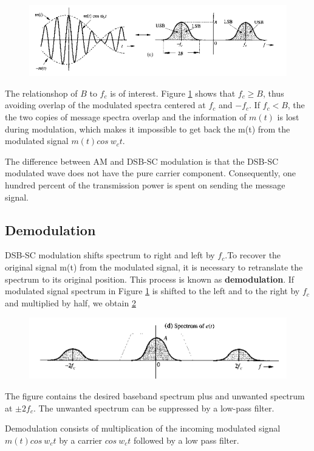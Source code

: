 \begin{figure}[h!]
  \includegraphics[width = 1.1\textwidth]{figures/DSBSC1.png}
  \caption{}
  \label{fig:DSBSC2}
\end{figure}

The relationshop of $B$ to $f_c$ is of interest. Figure \ref{fig:DSBSC2} shows that $f_c \geq B$, thus avoiding overlap of the modulated spectra centered at $f_c$ and $-f_c$. If $f_c < B$, the the two copies of message spectra overlap and the information of $m(t)$ is lost during modulation, which makes it impossible to get back the m(t) from the modulated signal $m(t)cos~w_ct$.
\par The difference between AM and DSB-SC modulation is that the DSB-SC modulated wave does not
have the pure carrier component. Consequently, one hundred percent of the transmission power is
spent on sending the message signal.

\subsection{Demodulation}
DSB-SC modulation shifts spectrum to right and left by $f_c$.To recover the original signal m(t) from the modulated signal, it is necessary to retranslate the spectrum to its original position. This process is known as \textbf{demodulation}.
If modulated signal spectrum in Figure \ref{fig:DSBSC2} is
shifted to the left and to the right by $f_c$ and multiplied by
half, we obtain \ref{fig:DSBSC3}

\begin{figure}[h!]
  \includegraphics[width = 1.1\textwidth]{figures/DSBSC3.png}
  \caption{}
  \label{fig:DSBSC3}
\end{figure}

The figure contains the desired baseband spectrum plus and unwanted spectrum at $\pm 2f_c$. The unwanted spectrum can be suppressed by a low-pass filter.
\par Demodulation consists of multiplication of the incoming
modulated signal $m(t)cos~w_ct$ by a carrier $cos~w_ct$ followed by a low pass filter.

